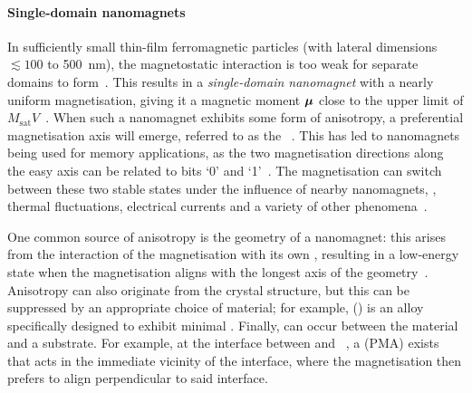 \paragraph{Single-domain nanomagnets}
In sufficiently small thin-film ferromagnetic particles (with lateral dimensions $\lesssim 100$ to \SI{500}{\nano\metre}), the magnetostatic interaction is too weak for separate domains to form~\cite{Kittel_TheoryFMDomains,BrownThermalFluctuations}.
This results in a \emph{single-domain nanomagnet} with a nearly uniform magnetisation, giving it a magnetic moment $\boldsymbol{\mathbf{\mu}}$ close to the upper limit of $M_\mathrm{sat}V$~\cite{FRENKEL1930,neel1949theorie}. %
When such a nanomagnet exhibits some form of anisotropy, a preferential magnetisation axis will emerge, referred to as the ~\cite{nisoli2013colloquium}.
This has led to nanomagnets being used for memory applications, as the two magnetisation directions along the easy axis can be related to bits `0' and `1'~\cite{MQCA_RoomTemp,NML_Carlton,Gypens_Balanced,Gypens_SelfOrganizing,JM_Masterproef}.
The magnetisation can switch between these two stable states under the influence of nearby nanomagnets, , thermal fluctuations, electrical currents and a variety of other phenomena~\cite{SwitchingForced_EnergyEfficient,BrownThermalFluctuations,neel1949theorie}. \par
One common source of anisotropy is the geometry of a nanomagnet: this  arises from the interaction of the magnetisation with its own , resulting in a low-energy state when the magnetisation aligns with the longest axis of the geometry~\cite{MagneticCharge}.
Anisotropy can also originate from the crystal structure, but this can be suppressed by an appropriate choice of material; for example,  () is an alloy specifically designed to exhibit minimal .
Finally,  can occur between the  material and a substrate.
For example, at the interface between  and ~\cite{PMA_PdCo_PtCo}, a  (PMA) exists that acts in the immediate vicinity of the interface, where the magnetisation then prefers to align perpendicular to said interface.

